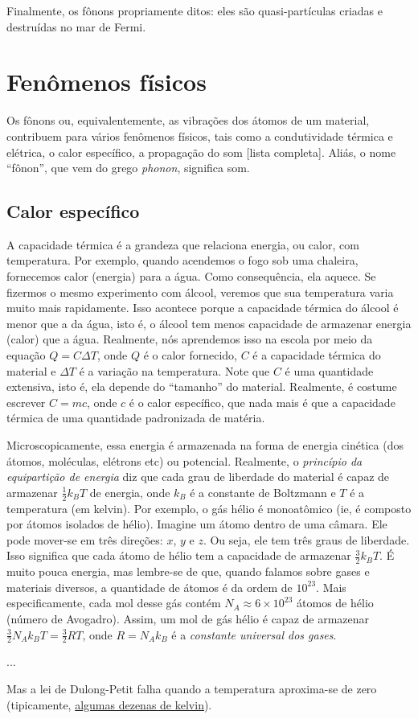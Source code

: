 \documentclass[a4paper,12pt]{scrartcl}
\newcommand\foreign[1]{\textsl{#1}}
\begin{document}
Finalmente, os fônons propriamente ditos: eles são quasi-partículas criadas e destruídas no mar de Fermi.

\section{Fenômenos físicos}

Os fônons ou, equivalentemente, as vibrações dos átomos de um material, contribuem para vários fenômenos físicos, tais como a condutividade térmica e elétrica, o calor específico, a propagação do som [lista completa]. Aliás, o nome ``fônon'', que vem do grego \foreign{phonon}, significa som.

\subsection{Calor específico}
	
A capacidade térmica é a grandeza que relaciona energia, ou calor, com temperatura. Por exemplo, quando acendemos o fogo sob uma chaleira, fornecemos calor (energia) para a água. Como consequência, ela aquece. Se fizermos o mesmo experimento com álcool, veremos que sua temperatura varia muito mais rapidamente. Isso acontece porque a capacidade térmica do álcool é menor que a da água, isto é, o álcool tem menos capacidade de armazenar energia (calor) que a água. Realmente, nós aprendemos isso na escola por meio da equação $Q = C \Delta T$, onde $Q$ é o calor fornecido, $C$ é a capacidade térmica do material e $\Delta T$ é a variação na temperatura. Note que $C$ é uma quantidade extensiva, isto é, ela depende do ``tamanho'' do material. Realmente, é costume escrever $C = mc$, onde $c$ é o calor específico, que nada mais é que a capacidade térmica de uma quantidade padronizada de matéria.

Microscopicamente, essa energia é armazenada na forma de energia cinética (dos átomos, moléculas, elétrons etc) ou potencial. Realmente, o \emph{princípio da equipartição de energia} diz que cada grau de liberdade do material é capaz de armazenar $\frac{1}{2}k_BT$ de energia, onde $k_B$ é a constante de Boltzmann e $T$ é a temperatura (em kelvin). Por exemplo, o gás hélio é monoatômico (ie, é composto por átomos isolados de hélio). Imagine um átomo dentro de uma câmara. Ele pode mover-se em três direções: $x$, $y$ e $z$. Ou seja, ele tem três graus de liberdade. Isso significa que cada átomo de hélio tem a capacidade de armazenar $\frac{3}{2}k_BT$. É muito pouca energia, mas lembre-se de que, quando falamos sobre gases e materiais diversos, a quantidade de átomos é da ordem de $10^{23}$. Mais especificamente, cada mol desse gás contém $N_A \approx 6 \times 10^{23}$ átomos de hélio (número de Avogadro). Assim, um mol de gás hélio é capaz de armazenar $\frac{3}{2}N_Ak_BT = \frac{3}{2}RT$, onde $R = N_Ak_B$ é a \emph{constante universal dos gases}.

...

Mas a lei de Dulong-Petit falha quando a temperatura aproxima-se de zero (tipicamente, \underline{algumas dezenas de kelvin}). 

	
\end{document}
